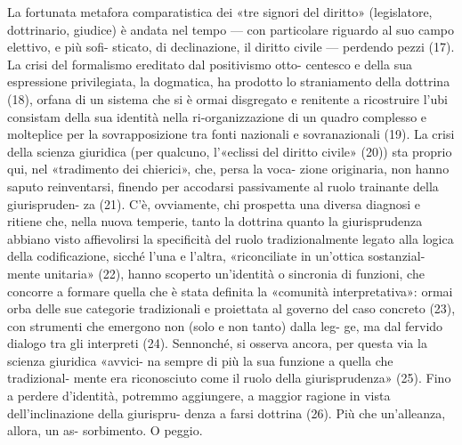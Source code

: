 La  fortunata  metafora  comparatistica  dei  «tre  signori  del 
diritto»  (legislatore,  dottrinario,  giudice)  è  andata  nel  tempo 
— con particolare riguardo al suo campo elettivo, e più sofi-
sticato,  di  declinazione,  il  diritto  civile  —  perdendo  pezzi 
(17).  La  crisi  del  formalismo  ereditato  dal  positivismo  otto-
centesco  e  della  sua  espressione  privilegiata,  la  dogmatica, 
ha  prodotto  lo  straniamento  della  dottrina  (18),  orfana  di  un 
sistema  che  si  è  ormai  disgregato  e  renitente  a  ricostruire 
l’ubi  consistam  della  sua  identità  nella  ri-organizzazione  di 
un quadro complesso e molteplice per la sovrapposizione tra 
fonti  nazionali  e  sovranazionali  (19).  La  crisi  della  scienza giuridica (per qualcuno, l’«eclissi del diritto civile» (20)) sta 
proprio qui, nel «tradimento dei chierici», che, persa la voca-
zione  originaria,  non  hanno  saputo  reinventarsi,  finendo  per 
accodarsi passivamente al ruolo trainante della giurispruden-
za  (21).  C’è, ovviamente,  chi  prospetta  una  diversa  diagnosi 
e ritiene che, nella nuova temperie, tanto la dottrina quanto la 
giurisprudenza  abbiano  visto  affievolirsi  la  specificità  del 
ruolo tradizionalmente legato alla logica della codificazione, 
sicché  l’una  e  l’altra,  «riconciliate  in  un’ottica  sostanzial-
mente  unitaria»  (22),  hanno  scoperto  un’identità  o  sincronia 
di funzioni, che concorre a formare quella che è stata definita 
la  «comunità  interpretativa»:  ormai  orba  delle  sue  categorie 
tradizionali  e  proiettata  al  governo  del  caso  concreto  (23), 
con strumenti che emergono non (solo e non tanto) dalla leg-
ge, ma dal fervido dialogo tra gli interpreti (24). Sennonché, 
si osserva ancora, per questa via la scienza giuridica «avvici-
na  sempre  di  più  la  sua  funzione  a  quella  che  tradizional-
mente  era  riconosciuto  come  il  ruolo  della  giurisprudenza» 
(25). Fino a perdere d’identità, potremmo aggiungere, a 
maggior  ragione  in  vista  dell’inclinazione  della  giurispru-
denza a farsi dottrina (26). Più che un’alleanza, allora, un as-
sorbimento. O peggio. 

